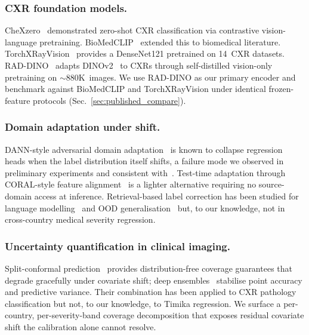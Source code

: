 \documentclass[runningheads]{llncs}
\begin{document}
\subsubsection{CXR foundation models.}
CheXzero~\cite{tiu2022chexzero} demonstrated zero-shot CXR classification via contrastive vision-language pretraining. BioMedCLIP~\cite{zhang2024biomedclip} extended this to biomedical literature. TorchXRayVision~\cite{cohen2022torchxrayvision} provides a DenseNet121 pretrained on 14~CXR datasets. RAD-DINO~\cite{perez2024raddino} adapts DINOv2~\cite{oquab2024dinov2} to CXRs through self-distilled vision-only pretraining on $\sim 880$K~images. We use RAD-DINO as our primary encoder and benchmark against BioMedCLIP and TorchXRayVision under identical frozen-feature protocols (Sec.~\ref{sec:published_compare}).

\subsubsection{Domain adaptation under shift.}
DANN-style adversarial domain adaptation~\cite{ganin2016domain} is known to collapse regression heads when the label distribution itself shifts, a failure mode we observed in preliminary experiments and consistent with~\cite{gulrajani2021domainbed}. Test-time adaptation through CORAL-style feature alignment~\cite{sun2016deepcoral} is a lighter alternative requiring no source-domain access at inference. Retrieval-based label correction has been studied for language modelling~\cite{khandelwal2020knnlm} and OOD generalisation~\cite{long2022retievalood} but, to our knowledge, not in cross-country medical severity regression.

\subsubsection{Uncertainty quantification in clinical imaging.}
Split-conformal prediction~\cite{angelopoulos2023conformalintro} provides distribution-free coverage guarantees that degrade gracefully under covariate shift; deep ensembles~\cite{lakshminarayanan2017deepensembles} stabilise point accuracy and predictive variance. Their combination has been applied to CXR pathology classification but not, to our knowledge, to Timika regression. We surface a per-country, per-severity-band coverage decomposition that exposes residual covariate shift the calibration alone cannot resolve.

\end{document}
